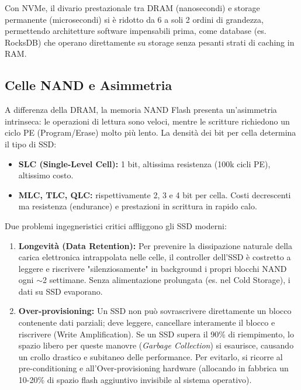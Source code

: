 \begin{tipbox}
Con NVMe, il divario prestazionale tra DRAM (nanosecondi) e storage permanente (microsecondi) si è ridotto da 6 a soli 2 ordini di grandezza, permettendo architetture software impensabili prima, come database (es. RocksDB) che operano direttamente su storage senza pesanti strati di caching in RAM.
\end{tipbox}

\subsection{Celle NAND e Asimmetria}
A differenza della DRAM, la memoria NAND Flash presenta un'asimmetria intrinseca: le operazioni di lettura sono veloci, mentre le scritture richiedono un ciclo PE (Program/Erase) molto più lento. La densità dei bit per cella determina il tipo di SSD:
\begin{itemize}
    \item \textbf{SLC (Single-Level Cell):} 1 bit, altissima resistenza (100k cicli PE), altissimo costo.
    \item \textbf{MLC, TLC, QLC:} rispettivamente 2, 3 e 4 bit per cella. Costi decrescenti ma resistenza (endurance) e prestazioni in scrittura in rapido calo.
\end{itemize}

\begin{warningbox}
Due problemi ingegneristici critici affliggono gli SSD moderni:
\begin{enumerate}
    \item \textbf{Longevità (Data Retention):} Per prevenire la dissipazione naturale della carica elettronica intrappolata nelle celle, il controller dell'SSD è costretto a leggere e riscrivere "silenziosamente" in background i propri blocchi NAND ogni $\sim$2 settimane. Senza alimentazione prolungata (es. nel Cold Storage), i dati su SSD evaporano.
    \item \textbf{Over-provisioning:} Un SSD non può sovrascrivere direttamente un blocco contenente dati parziali; deve leggere, cancellare interamente il blocco e riscrivere (Write Amplification). Se un SSD supera il 90\% di riempimento, lo spazio libero per queste manovre (\textit{Garbage Collection}) si esaurisce, causando un crollo drastico e subitaneo delle performance. Per evitarlo, si ricorre al pre-conditioning e all'Over-provisioning hardware (allocando in fabbrica un 10-20\% di spazio flash aggiuntivo invisibile al sistema operativo).
\end{enumerate}
\end{warningbox}


